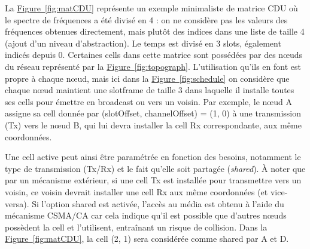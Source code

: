\documentclass[]{report}
\newcommand{\wordlink}[2]{\hyperref[#2]{#1~\ref{#2}}}
\begin{document}
\newpage

\par La \wordlink{Figure}{fig:matCDU} représente un exemple minimaliste de matrice CDU où le spectre de fréquences a été divisé en 4 : on ne considère pas les valeurs des fréquences obtenues directement, mais plutôt des indices dans une liste de taille 4 (ajout d'un niveau d'abstraction). Le temps est divisé en 3 slots, également indicés depuis 0. Certaines cells dans cette matrice sont possédées par des nœuds du réseau représenté par la \wordlink{Figure}{fig:topograph}. L'utilisation qu'ils en font est propre à chaque nœud, mais ici dans la \wordlink{Figure}{fig:schedule} on considère que chaque nœud maintient une slotframe de taille 3 dans laquelle il installe toutes ses cells pour émettre en broadcast ou vers un voisin. Par exemple, le nœud A assigne sa cell donnée par (slotOffset, channelOffset) = (1, 0) à une transmission (Tx) vers le nœud B, qui lui devra installer la cell Rx correspondante, aux même coordonnées.\\

\par Une cell active peut ainsi être paramétrée en fonction des besoins, notamment le type de transmission (Tx/Rx) et le fait qu'elle soit partagée (\textit{shared}). À noter que par un mécanisme extérieur, si une cell Tx est installée pour transmettre vers un voisin, ce voisin devrait installer une cell Rx aux même coordonnées (et vice-versa). Si l'option shared est activée, l'accès au média est obtenu à l'aide du mécanisme CSMA/CA car cela indique qu'il est possible que d'autres nœuds possèdent la cell et l'utilisent, entraînant un risque de collision. Dans la \wordlink{Figure}{fig:matCDU}, la cell (2, 1) sera considérée comme shared par A et D.\\
\end{document}
